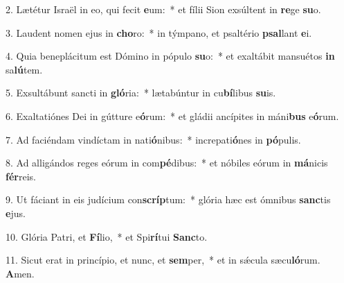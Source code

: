 2. Lætétur Israël in eo, qui fecit \textbf{e}um:~*  et fílii Sion exsúltent in \textbf{re}ge \textbf{su}o.\

3. Laudent nomen ejus in \textbf{cho}ro:~*  in týmpano, et psaltério \textbf{psal}lant \textbf{e}i.\

4. Quia beneplácitum est Dómino in pópulo \textbf{su}o:~*  et exaltábit mansuétos \textbf{in} sa\textbf{lú}tem.\

5. Exsultábunt sancti in \textbf{gló}ria:~*  lætabúntur in cu\textbf{bí}libus \textbf{su}is.\

6. Exaltatiónes Dei in gútture e\textbf{ó}rum:~*  et gládii ancípites in máni\textbf{bus} e\textbf{ó}rum.\

7. Ad faciéndam vindíctam in nati\textbf{ó}nibus:~*  increpati\textbf{ó}nes in \textbf{pó}pulis.\

8. Ad alligándos reges eórum in com\textbf{pé}dibus:~*  et nóbiles eórum in \textbf{má}nicis \textbf{fér}reis.\

9. Ut fáciant in eis judícium con\textbf{scríp}tum:~*  glória hæc est ómnibus \textbf{sanc}tis \textbf{e}jus.\

10. Glória Patri, et \textbf{Fí}lio,~*  et Spi\textbf{rí}tui \textbf{Sanc}to.\

11. Sicut erat in princípio, et nunc, et \textbf{sem}per,~*  et in sǽcula sæcu\textbf{ló}rum. \textbf{A}men.\

